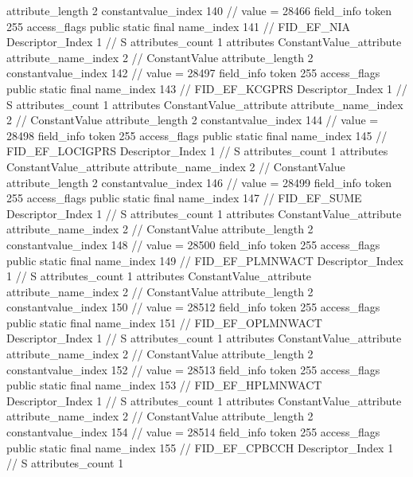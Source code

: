 {{{{{{{					attribute_length	2
					constantvalue_index	140		// value = 28466
				}
				}
			}
			field_info {
				token	255
				access_flags	public static final
				name_index	141		// FID_EF_NIA
				Descriptor_Index	1		// S
				attributes_count	1
				attributes {
				ConstantValue_attribute {
					attribute_name_index	2		// ConstantValue
					attribute_length	2
					constantvalue_index	142		// value = 28497
				}
				}
			}
			field_info {
				token	255
				access_flags	public static final
				name_index	143		// FID_EF_KCGPRS
				Descriptor_Index	1		// S
				attributes_count	1
				attributes {
				ConstantValue_attribute {
					attribute_name_index	2		// ConstantValue
					attribute_length	2
					constantvalue_index	144		// value = 28498
				}
				}
			}
			field_info {
				token	255
				access_flags	public static final
				name_index	145		// FID_EF_LOCIGPRS
				Descriptor_Index	1		// S
				attributes_count	1
				attributes {
				ConstantValue_attribute {
					attribute_name_index	2		// ConstantValue
					attribute_length	2
					constantvalue_index	146		// value = 28499
				}
				}
			}
			field_info {
				token	255
				access_flags	public static final
				name_index	147		// FID_EF_SUME
				Descriptor_Index	1		// S
				attributes_count	1
				attributes {
				ConstantValue_attribute {
					attribute_name_index	2		// ConstantValue
					attribute_length	2
					constantvalue_index	148		// value = 28500
				}
				}
			}
			field_info {
				token	255
				access_flags	public static final
				name_index	149		// FID_EF_PLMNWACT
				Descriptor_Index	1		// S
				attributes_count	1
				attributes {
				ConstantValue_attribute {
					attribute_name_index	2		// ConstantValue
					attribute_length	2
					constantvalue_index	150		// value = 28512
				}
				}
			}
			field_info {
				token	255
				access_flags	public static final
				name_index	151		// FID_EF_OPLMNWACT
				Descriptor_Index	1		// S
				attributes_count	1
				attributes {
				ConstantValue_attribute {
					attribute_name_index	2		// ConstantValue
					attribute_length	2
					constantvalue_index	152		// value = 28513
				}
				}
			}
			field_info {
				token	255
				access_flags	public static final
				name_index	153		// FID_EF_HPLMNWACT
				Descriptor_Index	1		// S
				attributes_count	1
				attributes {
				ConstantValue_attribute {
					attribute_name_index	2		// ConstantValue
					attribute_length	2
					constantvalue_index	154		// value = 28514
				}
				}
			}
			field_info {
				token	255
				access_flags	public static final
				name_index	155		// FID_EF_CPBCCH
				Descriptor_Index	1		// S
				attributes_count	1
}}}}}
